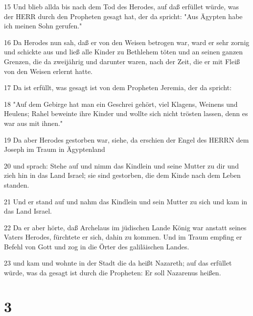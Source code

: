 \par 15 Und blieb allda bis nach dem Tod des Herodes, auf daß erfüllet würde, was der HERR durch den Propheten gesagt hat, der da spricht: "Aus Ägypten habe ich meinen Sohn gerufen."
\par 16 Da Herodes nun sah, daß er von den Weisen betrogen war, ward er sehr zornig und schickte aus und ließ alle Kinder zu Bethlehem töten und an seinen ganzen Grenzen, die da zweijährig und darunter waren, nach der Zeit, die er mit Fleiß von den Weisen erlernt hatte.
\par 17 Da ist erfüllt, was gesagt ist von dem Propheten Jeremia, der da spricht:
\par 18 "Auf dem Gebirge hat man ein Geschrei gehört, viel Klagens, Weinens und Heulens; Rahel beweinte ihre Kinder und wollte sich nicht trösten lassen, denn es war aus mit ihnen."
\par 19 Da aber Herodes gestorben war, siehe, da erschien der Engel des HERRN dem Joseph im Traum in Ägyptenland
\par 20 und sprach: Stehe auf und nimm das Kindlein und seine Mutter zu dir und zieh hin in das Land Israel; sie sind gestorben, die dem Kinde nach dem Leben standen.
\par 21 Und er stand auf und nahm das Kindlein und sein Mutter zu sich und kam in das Land Israel.
\par 22 Da er aber hörte, daß Archelaus im jüdischen Lande König war anstatt seines Vaters Herodes, fürchtete er sich, dahin zu kommen. Und im Traum empfing er Befehl von Gott und zog in die Örter des galiläischen Landes.
\par 23 und kam und wohnte in der Stadt die da heißt Nazareth; auf das erfüllet würde, was da gesagt ist durch die Propheten: Er soll Nazarenus heißen.

\chapter{3}

